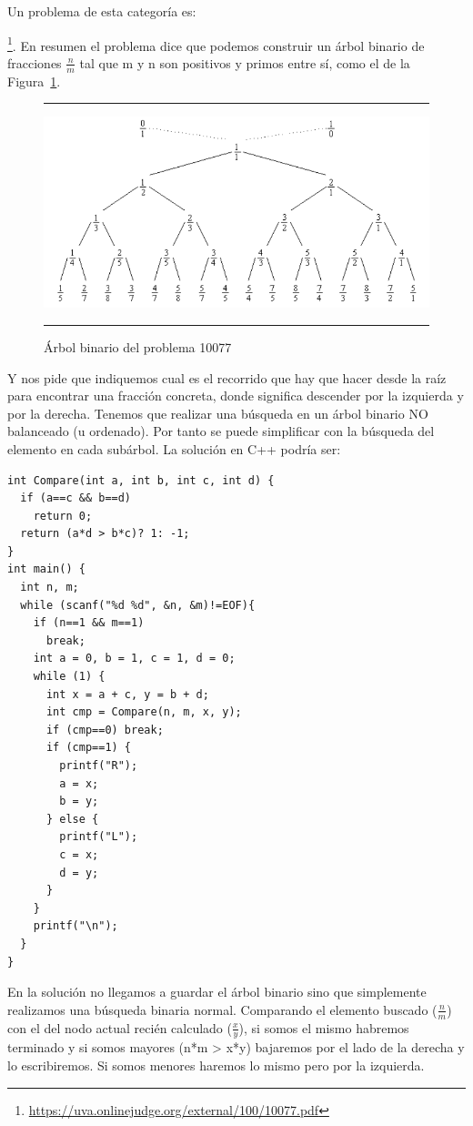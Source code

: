 Un problema de esta categoría es:

\footnote{\url{https://uva.onlinejudge.org/external/100/10077.pdf}}.
En resumen el problema dice que podemos construir un árbol binario de
fracciones $\frac{n}{m}$ tal que m y n son positivos y primos entre sí, como
el de la Figura~\ref{fig:problema10077}.

\begin{figure}[h]
\hrule\smallskip
\begin{center}
\includegraphics[width=1\textwidth]{fig/problema10077.png}
\end{center}
\caption{Árbol binario del problema 10077}
\label{fig:problema10077}
\hrule
\end{figure}

Y nos pide que indiquemos cual es el recorrido que hay que hacer desde
la raíz para encontrar una fracción concreta, donde  significa
descender por la izquierda y  por la derecha. Tenemos que
realizar una búsqueda en un árbol binario NO balanceado (u
ordenado). Por tanto se puede simplificar con la búsqueda del elemento
en cada subárbol. La solución en C++ podría ser:

\medskip
\begin{lstlisting}
int Compare(int a, int b, int c, int d) {
  if (a==c && b==d) 
    return 0;
  return (a*d > b*c)? 1: -1;
}
int main() {
  int n, m;
  while (scanf("%d %d", &n, &m)!=EOF){
    if (n==1 && m==1) 
      break;
    int a = 0, b = 1, c = 1, d = 0;
    while (1) {
      int x = a + c, y = b + d;
      int cmp = Compare(n, m, x, y);
      if (cmp==0) break;
      if (cmp==1) {
        printf("R");
        a = x;
        b = y;
      } else {
        printf("L");
        c = x;
        d = y;
      }
    }
    printf("\n");
  }
}
\end{lstlisting}

En la solución no llegamos a guardar el árbol binario sino que
simplemente realizamos una búsqueda binaria normal. Comparando el
elemento buscado ($\frac{n}{m}$) con el del nodo actual recién
calculado ($\frac{x}{y}$), si somos el mismo habremos terminado y si somos
mayores (n*m > x*y) bajaremos por el lado de la derecha y lo
escribiremos. Si somos menores haremos lo mismo pero por la izquierda.


